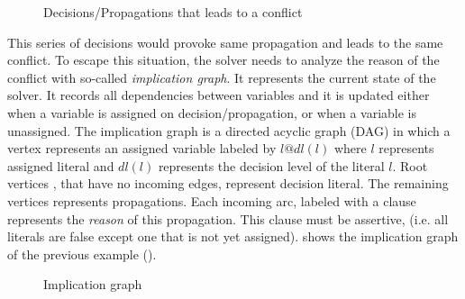 \begin{figure}[!htbp]
 \centering
  
 \caption{Decisions/Propagations that leads to a  conflict}
 \label{fig:conflict}
\end{figure}
This series of decisions would provoke same propagation and leads to the same conflict. To escape this
situation, the solver needs to analyze the reason of the conflict with so-called \emph{implication graph}.
It represents the current state of the solver. It records all dependencies between  variables and  it is updated either when a variable is assigned on decision/propagation, or  when a variable
is unassigned. The implication graph is a directed acyclic graph (DAG) in which a vertex represents an assigned variable labeled by $l@dl(l)$ where $l$ represents assigned literal and $dl(l)$ represents the decision level of the literal $l$.
Root vertices , that have no incoming edges, represent decision literal. The remaining vertices represents
propagations.
Each incoming arc, labeled with a clause represents the \emph{reason} of this propagation.
This clause must be assertive, (i.e. all  literals are false except one that is not yet assigned).
 shows the implication graph of the previous example ().
\begin{figure}[!htbp]
 \centering
 
 \caption{Implication graph}
 \label{fig:implication-graph}
\end{figure}

